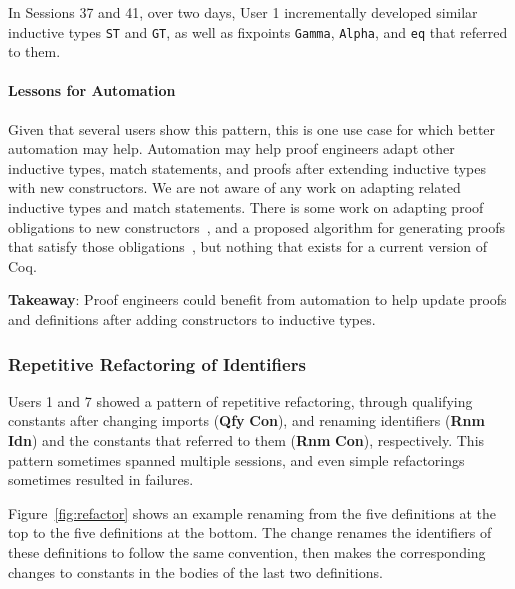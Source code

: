 In Sessions 37 and 41, over two days,
User 1 incrementally developed similar inductive types
\lstinline{ST} and \lstinline{GT}, as well as fixpoints
\lstinline{Gamma}, \lstinline{Alpha}, and \lstinline{eq} 
that referred to them.

\paragraph{Lessons for Automation}

Given that several users show this pattern,
this is one use case for which better automation may help.
Automation may help proof engineers adapt other inductive types,
match statements, and proofs after extending inductive types
with new constructors.
We are not aware of any work on adapting related inductive types and 
match statements.
There is some work on adapting proof obligations to new
constructors~\cite{Boite2004},
and a proposed algorithm for generating proofs that satisfy those
obligations~\cite{Mulhern06proofweaving}, but nothing that exists for
a current version of Coq.

\begin{displayquote}
  \textbf{Takeaway}:
  Proof engineers could benefit from automation to help update proofs and definitions
  after adding constructors to inductive types.
\end{displayquote}

\subsubsection{Repetitive Refactoring of Identifiers}
\label{sec:pat2}

Users 1 and 7 showed a pattern of repetitive refactoring, through
qualifying constants after changing imports (\textbf{Qfy} \textbf{Con}),
and renaming identifiers (\textbf{Rnm} \textbf{Idn}) and the constants
that referred to them (\textbf{Rnm} \textbf{Con}), respectively.
This pattern sometimes spanned multiple sessions, and even simple refactorings
sometimes resulted in failures.

Figure~\ref{fig:refactor} shows an example renaming from the five
definitions at the top to the five definitions at the bottom.
The change renames the identifiers of these definitions to
follow the same convention, then makes the corresponding changes
to constants in the bodies of the last two definitions.  

